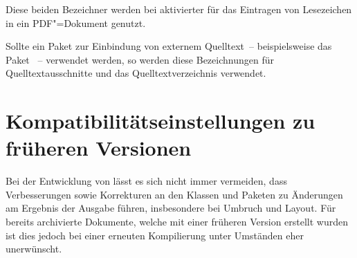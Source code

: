 \begin{Declaration}{}
\begin{Declaration}{}
\printdeclarationlist%
%
%
Diese beiden Bezeichner werden bei aktivierter  für das 
Eintragen von Lesezeichen in ein PDF"=Dokument genutzt.
\end{Declaration}
\end{Declaration}

\begin{Declaration}{}
\begin{Declaration}{}
\printdeclarationlist%
%
Sollte ein Paket zur Einbindung von externem Quelltext~-- beispielsweise 
das Paket ~-- verwendet werden, so werden diese Bezeichnungen 
für Quelltextausschnitte und das Quelltextverzeichnis verwendet.
\end{Declaration}
\end{Declaration}

\section{Kompatibilitätseinstellungen zu früheren Versionen}
Bei der Entwicklung von \TUDScript lässt es sich nicht immer vermeiden, dass 
Verbesserungen sowie Korrekturen an den Klassen und Paketen zu Änderungen am 
Ergebnis der Ausgabe führen, insbesondere bei Umbruch und Layout. Für bereits
archivierte Dokumente, welche mit einer früheren Version erstellt wurden ist 
dies jedoch bei einer erneuten Kompilierung unter Umständen eher unerwünscht.

